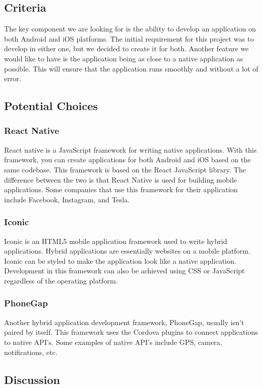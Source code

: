 \documentclass[onecolumn, draftclsnofoot,10pt, compsoc]{IEEEtran}
\begin{document}
\subsection{Criteria}

The key component we are looking for is the ability to develop an application on both Android and iOS platforms. The initial requirement for this project was to develop in either one, but we decided to create it for both. Another feature we would like to have is the application being as close to a native application as possible. This will ensure that the application runs smoothly and without a lot of error. 

\subsection{Potential Choices}
\subsubsection{React Native}
React native is a JavaScript framework for writing native applications. With this framework, you can create applications for both Android and iOS based on the same codebase. This framework is based on the React JavaScript library. The difference between the two is that React Native is used for building mobile applications. Some companies that use this framework for their application include Facebook, Instagram, and Tesla.
\subsubsection{Iconic}

Iconic is an HTML5 mobile application framework used to write hybrid applications. Hybrid applications are essentially websites on a mobile platform. Iconic can be styled to make the application look like a native application. Development in this framework can also be achieved using CSS or JavaScript regardless of the operating platform. 
\subsubsection{PhoneGap}

Another hybrid application development framework, PhoneGap, usually isn't paired by itself. This framework uses the Cordova plugins to connect applications to native API's. Some examples of native API's include GPS, camera, notifications, etc.

\subsection{Discussion}
\end{document}
